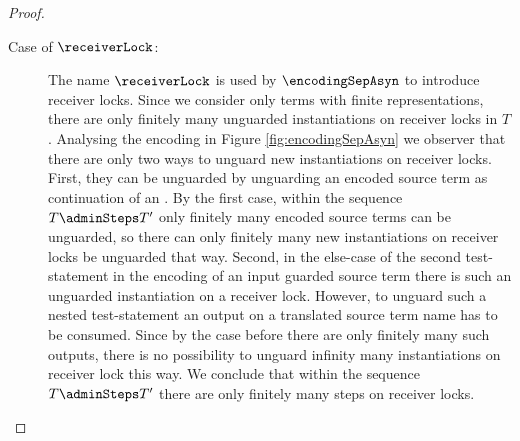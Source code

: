 \documentclass[]{llncs}
\begin{document}
\begin{proof}
\begin{description}
		\item[Case of $ \receiverLock $:] The name $ \receiverLock $ is used by $ \encodingSepAsyn $ to introduce receiver locks. Since we consider only terms with finite representations, there are only finitely many unguarded instantiations on receiver locks in $ T $. Analysing the encoding in Figure \ref{fig:encodingSepAsyn} we observer that there are only two ways to unguard new instantiations on receiver locks. First, they can be unguarded by unguarding an encoded source term as continuation of an \simulation. By the first case, within the sequence $ T \adminSteps T' $ only finitely many encoded source terms can be unguarded, so there can only finitely many new instantiations on receiver locks be unguarded that way. Second, in the else-case of the second test-statement in the encoding of an input guarded source term there is such an unguarded instantiation on a receiver lock. However, to unguard such a nested test-statement an output on a translated source term name has to be consumed. Since by the case before there are only finitely many such outputs, there is no possibility to unguard infinity many instantiations on receiver lock this way. We conclude that within the sequence $ T \adminSteps T' $ there are only finitely many steps on receiver locks.
			

\end{description}
\end{proof}
\end{document}
